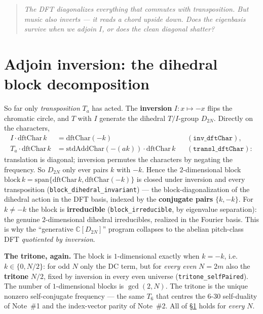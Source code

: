 \documentclass[11pt]{article}
\newcommand{\lean}[1]{\texttt{#1}}
\newcommand{\qlink}[1]{\par\medskip\begin{quote}\itshape\small\color{ctB!88!black}#1\end{quote}\medskip}
\begin{document}
\qlink{The DFT diagonalizes everything that commutes with transposition. But music also \emph{inverts} ---
it reads a chord upside down. Does the eigenbasis survive when we adjoin $I$, or does the clean diagonal
shatter?}

\section{Adjoin inversion: the dihedral block decomposition}\label{sec:dihedral}

So far only \emph{transposition} $T_a$ has acted. The \textbf{inversion} $I:x\mapsto-x$ flips the chromatic
circle, and $T$ with $I$ generate the dihedral $T/I$-group $D_{2N}$. Directly on the characters,
\[
\begin{aligned}
  I\cdot\mathrm{dftChar}\,k &= \mathrm{dftChar}(-k) && (\lean{inv\_dftChar}),\\[2pt]
  T_a\cdot\mathrm{dftChar}\,k &= \mathrm{stdAddChar}(-(ak))\cdot\mathrm{dftChar}\,k && (\lean{transl\_dftChar}):
\end{aligned}
\]
translation is diagonal; inversion permutes the characters by negating the frequency. So $D_{2N}$ only ever
pairs $k$ with $-k$. Hence the $2$-dimensional block $\mathrm{block}\,k=\mathrm{span}\{\mathrm{dftChar}\,k,
\mathrm{dftChar}(-k)\}$ is closed under inversion and every transposition (\lean{block\_dihedral\_invariant})
--- the block-diagonalization of the dihedral action in the DFT basis, indexed by the \textbf{conjugate
pairs} $\{k,-k\}$. For $k\neq-k$ the block is \textbf{irreducible} (\lean{block\_irreducible}, by eigenvalue
separation): the genuine $2$-dimensional dihedral irreducibles, realized in the Fourier basis. This is why
the ``generative $\mathbb{C}[D_{2N}]$'' program collapses to the abelian pitch-class DFT \emph{quotiented by
inversion}.

\textbf{The tritone, again.} The block is $1$-dimensional exactly when $k=-k$, i.e. $k\in\{0,N/2\}$: for odd
$N$ only the DC term, but for \emph{every even} $N=2m$ also the \textbf{tritone} $N/2$, fixed by inversion in
every even universe (\lean{tritone\_selfPaired}). The number of $1$-dimensional blocks is $\gcd(2,N)$. The
tritone is the unique nonzero self-conjugate frequency --- the same $T_6$ that centres the 6-30 self-duality
of Note~\#1 and the index-vector parity of Note~\#2. All of \S\ref{sec:dihedral} holds for \emph{every} $N$.
\end{document}
